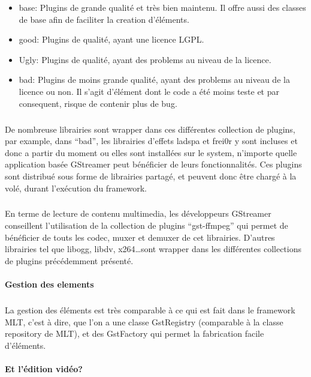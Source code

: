 \begin{itemize}

  \item {base: Plugins de grande qualité et très bien maintenu. Il
  offre aussi
    des classes de base afin de faciliter la creation d'éléments.}

  \item {good: Plugins de qualité, ayant une licence LGPL}.

  \item {Ugly: Plugins de qualité, ayant des problems au niveau de
  la licence.}

  \item {bad: Plugins de moins grande qualité, ayant des problems
  au niveau
    de la licence ou non. Il s'agit d'élément dont le code a été
    moins teste et par consequent, risque de contenir plus de bug.}

\end{itemize}

\subparagraph{}

De nombreuse librairies sont wrapper dans ces différentes collection
de plugins, par example, dans ``bad'', les librairies d'effets ladspa
et frei0r y sont incluses et donc a partir du moment ou elles sont
installées sur le system, n'importe quelle application basée GStreamer
peut bénéficier de leurs fonctionnalités.  Ces plugins sont distribué
sous forme de librairies partagé, et peuvent donc être chargé à la
volé, durant l'exécution du framework.

\subparagraph{}

En terme de lecture de contenu multimedia, les développeurs GStreamer
conseillent l'utilisation de la collection de plugins ``gst-ffmpeg''
qui permet de bénéficier de touts les codec, muxer et demuxer de cet
librairies. D'autres librairies tel que libogg, libdv, x264\ldots sont
wrapper dans les différentes collections de plugins précédemment
présenté.

\paragraph{Gestion des elements}

\subparagraph{}

La gestion des éléments est très comparable à ce qui est fait
dans le framework MLT, c'est à dire, que l'on a une classe GstRegistry
(comparable à la classe repository de MLT), et des GstFactory qui permet
la fabrication facile d'éléments.

\paragraph{Et l'édition vidéo?}

